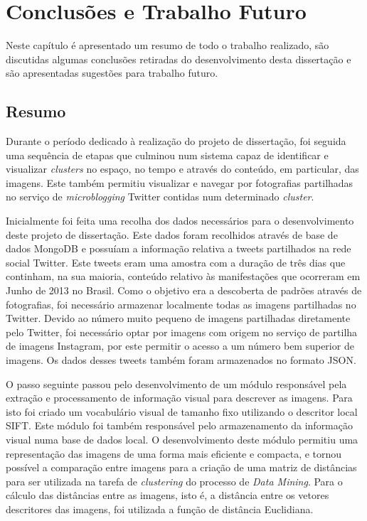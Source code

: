 \chapter{Conclusões e Trabalho Futuro} \label{chap:concl}

Neste capítulo é apresentado um resumo de todo o trabalho realizado, são discutidas algumas conclusões retiradas do desenvolvimento desta dissertação e são apresentadas sugestões para trabalho futuro.

\section{Resumo}

Durante o período dedicado à realização do projeto de dissertação, foi seguida uma sequência de etapas que culminou num sistema capaz de identificar e visualizar \textit{clusters} no espaço, no tempo e através do conteúdo, em particular, das imagens. Este também permitiu visualizar e navegar por fotografias partilhadas no serviço de \textit{microblogging} Twitter contidas num determinado \textit{cluster}.

Inicialmente foi feita uma recolha dos dados necessários para o desenvolvimento deste projeto de dissertação. Este dados foram recolhidos através de base de dados MongoDB e possuíam a informação relativa a tweets partilhados na rede social Twitter. Este tweets eram uma amostra com a duração de três dias que continham, na sua maioria, conteúdo relativo às manifestações que ocorreram em Junho de 2013 no Brasil. Como o objetivo era a descoberta de padrões através de fotografias, foi necessário armazenar localmente todas as imagens partilhadas no Twitter. Devido ao número muito pequeno de imagens partilhadas diretamente pelo Twitter, foi necessário optar por imagens com origem no serviço de partilha de imagens Instagram, por este permitir o acesso a um número bem superior de imagens. Os dados desses tweets também foram armazenados no formato JSON.

O passo seguinte passou pelo desenvolvimento de um módulo responsável pela extração e processamento de informação visual para descrever as imagens. Para isto foi criado um vocabulário visual de tamanho fixo utilizando o descritor local SIFT. Este módulo foi também responsável pelo armazenamento da informação visual numa base de dados local. O desenvolvimento deste módulo permitiu uma representação das imagens de uma forma mais eficiente e compacta, e tornou possível a comparação entre imagens para a criação de uma matriz de distâncias para ser utilizada na tarefa de \textit{clustering} do processo de \textit{Data Mining}. Para o cálculo das distâncias entre as imagens, isto é, a distância entre os vetores descritores das imagens, foi utilizada a função de distância Euclidiana.

